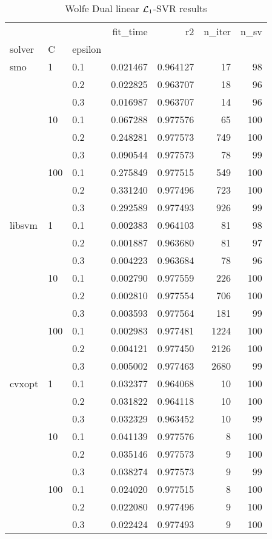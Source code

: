 \begin{table}[H]
\centering
\caption{Wolfe Dual linear $\protect \mathcal{L}_1$-SVR results}
\label{linear_dual_l1_svr_cv_results}
\begin{tabular}{lllrrrr}
\toprule
       &     &     &  fit\_time &        r2 &  n\_iter &  n\_sv \\
solver & C & epsilon &           &           &         &       \\
\midrule
smo & 1   & 0.1 &  0.021467 &  0.964127 &      17 &    98 \\
       &     & 0.2 &  0.022825 &  0.963707 &      18 &    96 \\
       &     & 0.3 &  0.016987 &  0.963707 &      14 &    96 \\
       & 10  & 0.1 &  0.067288 &  0.977576 &      65 &   100 \\
       &     & 0.2 &  0.248281 &  0.977573 &     749 &   100 \\
       &     & 0.3 &  0.090544 &  0.977573 &      78 &    99 \\
       & 100 & 0.1 &  0.275849 &  0.977515 &     549 &   100 \\
       &     & 0.2 &  0.331240 &  0.977496 &     723 &   100 \\
       &     & 0.3 &  0.292589 &  0.977493 &     926 &    99 \\
libsvm & 1   & 0.1 &  0.002383 &  0.964103 &      81 &    98 \\
       &     & 0.2 &  0.001887 &  0.963680 &      81 &    97 \\
       &     & 0.3 &  0.004223 &  0.963684 &      78 &    96 \\
       & 10  & 0.1 &  0.002790 &  0.977559 &     226 &   100 \\
       &     & 0.2 &  0.002810 &  0.977554 &     706 &   100 \\
       &     & 0.3 &  0.003593 &  0.977564 &     181 &    99 \\
       & 100 & 0.1 &  0.002983 &  0.977481 &    1224 &   100 \\
       &     & 0.2 &  0.004121 &  0.977450 &    2126 &   100 \\
       &     & 0.3 &  0.005002 &  0.977463 &    2680 &    99 \\
cvxopt & 1   & 0.1 &  0.032377 &  0.964068 &      10 &   100 \\
       &     & 0.2 &  0.031822 &  0.964118 &      10 &   100 \\
       &     & 0.3 &  0.032329 &  0.963452 &      10 &    99 \\
       & 10  & 0.1 &  0.041139 &  0.977576 &       8 &   100 \\
       &     & 0.2 &  0.035146 &  0.977573 &       9 &   100 \\
       &     & 0.3 &  0.038274 &  0.977573 &       9 &    99 \\
       & 100 & 0.1 &  0.024020 &  0.977515 &       8 &   100 \\
       &     & 0.2 &  0.022080 &  0.977496 &       9 &   100 \\
       &     & 0.3 &  0.022424 &  0.977493 &       9 &   100 \\
\bottomrule
\end{tabular}
\end{table}

